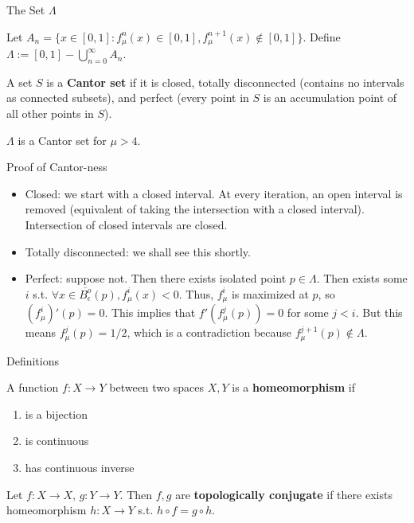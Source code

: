 \documentclass[aspectratio=169]{beamer}
\begin{document}
\begin{frame}{The Set $\Lambda$}
\begin{defn}
    Let $A_n = \{x \in [0,1]: f_\mu^n(x) \in [0,1],f_\mu^{n+1}(x) \notin [0,1]\}.$ Define $\Lambda := [0,1]-\displaystyle\bigcup_{n=0}^\infty A_n$.  
\end{defn}
\begin{defn}
    A set $S$ is a \textbf{Cantor set} if it is closed, totally disconnected (contains no intervals as connected subsets), and perfect (every point in $S$ is an accumulation point of all other points in $S$). 
\end{defn}
\begin{prop}
    $\Lambda$ is a Cantor set for $\mu>4$. 
\end{prop}
\end{frame}

\begin{frame}{Proof of Cantor-ness}
\begin{pf}
\begin{itemize}
    \item Closed: we start with a closed interval. At every iteration, an open interval is removed (equivalent of taking the intersection with a closed interval). Intersection of closed intervals are closed. 
    \item Totally disconnected: we shall see this shortly. 
    \item Perfect: suppose not. Then there exists isolated point $p \in\Lambda$. Then exists some $i$ s.t. $\forall x\in \overline{B_\epsilon^o}(p), f_\mu^i(x)<0$. Thus, $f_\mu^i$ is maximized at $p$, so $(f_\mu^i)'(p)=0$. This implies that $f'(f_\mu^j(p))=0$ for some $j<i$. But this means $f_\mu^j(p) = 1/2$, which is a contradiction because $f_\mu^{j+1}(p) \notin \Lambda$.   
\end{itemize}
\end{pf}
\end{frame}

\begin{frame}{Definitions}
\begin{defn}
    A function $f:X\rightarrow Y$ between two spaces $X,Y$ is a \textbf{homeomorphism} if
    \begin{enumerate}
        \item is a bijection
        \item is continuous 
        \item has continuous inverse
    \end{enumerate}
\end{defn}
\begin{defn}
    Let $f:X\rightarrow X$, $g:Y\rightarrow Y$. Then $f,g$ are \textbf{topologically conjugate} if there exists homeomorphism $h:X\rightarrow Y$ s.t. $h\circ f = g\circ h$. 
\end{defn}
\end{frame}
\end{document}
